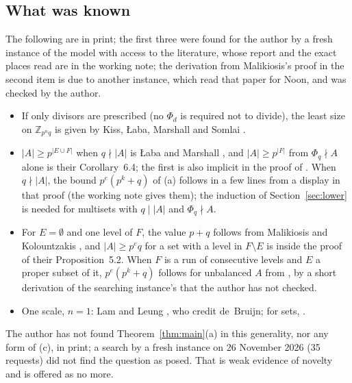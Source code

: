 \documentclass[11pt,a4paper]{amsart}
\theoremstyle{definition}
\theoremstyle{remark}
\newcommand{\Z}{\mathbb{Z}}
\begin{document}
\subsection{What was known} The following are in print; the first three were found for the author by a
fresh instance of the model with access to the literature, whose report and the exact places read are in the
working note; the derivation from Malikiosis's proof in the second item is due to another instance, which read
that paper for Noon, and was checked by the author.
\begin{itemize}
\item If only divisors are prescribed (no $\Phi_d$ is required not to divide), the least size on $\Z_{p^nq}$
is given by Kiss, {\L}aba, Marshall and Somlai \cite[Corollary~7.3]{KLaMS}.
\item $|A|\ge p^{|E\cup F|}$ when $q\nmid|A|$ is {\L}aba and Marshall \cite[Theorem~1.2]{LaM}, and
$|A|\ge p^{|F|}$ from $\Phi_q\nmid A$ alone is their Corollary~6.4; the first is also implicit in the proof of
\cite[Theorem~6.1]{Mal}. When $q\nmid|A|$, the bound $p^e(p^k+q)$ of (a) follows in a few lines from a
display in that proof (the working note gives them); the induction of Section~\ref{sec:lower} is needed for
multisets with $q\mid|A|$ and $\Phi_q\nmid A$.
\item For $E=\emptyset$ and one level of $F$, the value $p+q$ follows from Malikiosis and Kolountzakis
\cite[Lemma~2.5, Proposition~2.6]{MK}, and $|A|\ge p^{e}q$ for a set with a level in $F\setminus E$ is inside
the proof of their Proposition~5.2. When $F$ is a run of consecutive levels and $E$ a proper subset of it,
$p^e(p^k+q)$ follows for unbalanced $A$ from \cite[Proposition~6.3 and Lemma~6.2]{KLaMS}, by a short derivation of the searching instance's that the author has not checked.
\item One scale, $n=1$: Lam and Leung \cite[Theorem~3.3]{LL}, who credit de~Bruijn; for sets,
\cite[Proposition~3.8]{KMSV}.
\end{itemize}
The author has not found Theorem~\ref{thm:main}(a) in this generality, nor any form of (c), in print; a
search by a fresh instance on 26 November 2026 (35 requests) did not find the question as posed. That is
weak evidence of novelty and is offered as no more.
\end{document}

